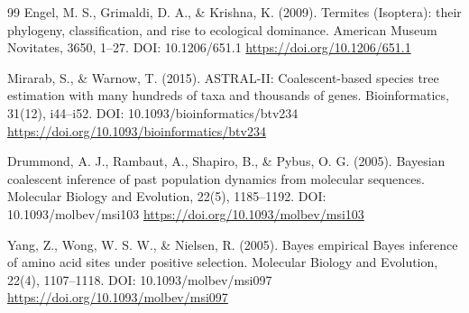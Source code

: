 \documentclass[10pt,letterpaper]{article}
\begin{document}
\begin{thebibliography}{99}
 Engel, M. S., Grimaldi, D. A., \& Krishna, K. (2009). Termites (Isoptera): their phylogeny, classification, and rise to ecological dominance. American Museum Novitates, 3650, 1--27. DOI: 10.1206/651.1 \url{https://doi.org/10.1206/651.1}

 Mirarab, S., \& Warnow, T. (2015). ASTRAL-II: Coalescent-based species tree estimation with many hundreds of taxa and thousands of genes. Bioinformatics, 31(12), i44--i52. DOI: 10.1093/bioinformatics/btv234 \url{https://doi.org/10.1093/bioinformatics/btv234}

 Drummond, A. J., Rambaut, A., Shapiro, B., \& Pybus, O. G. (2005). Bayesian coalescent inference of past population dynamics from molecular sequences. Molecular Biology and Evolution, 22(5), 1185--1192. DOI: 10.1093/molbev/msi103 \url{https://doi.org/10.1093/molbev/msi103}

 Yang, Z., Wong, W. S. W., \& Nielsen, R. (2005). Bayes empirical Bayes inference of amino acid sites under positive selection. Molecular Biology and Evolution, 22(4), 1107--1118. DOI: 10.1093/molbev/msi097 \url{https://doi.org/10.1093/molbev/msi097}

\end{thebibliography}
\end{document}
